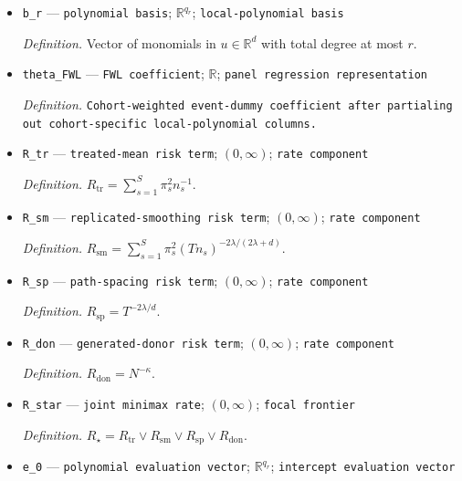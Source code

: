 \documentclass{article}
\begin{document}
\begin{itemize}
  \par\smallskip\noindent\emph{Definition.} A fixed nonnegative bounded compactly supported product weighting kernel that is bounded away from zero on a neighborhood of the origin and is used with the degree-\(r\) local-polynomial basis.
  \item \texttt{b\_\allowbreak{}r} --- \texttt{polynomial basis}; \(\mathbb R^{q_r}\); \texttt{local-\allowbreak{}polynomial basis}
  \par\smallskip\noindent\emph{Definition.} Vector of monomials in \(u\in\mathbb R^d\) with total degree at most \(r\).
  \item \texttt{theta\_\allowbreak{}FWL} --- \texttt{FWL coefficient}; \(\mathbb R\); \texttt{panel regression representation}
  \par\smallskip\noindent\emph{Definition.} \texttt{Cohort-\allowbreak{}weighted event-\allowbreak{}dummy coefficient after partialing out cohort-\allowbreak{}specific local-\allowbreak{}polynomial columns.}
  \item \texttt{R\_\allowbreak{}tr} --- \texttt{treated-\allowbreak{}mean risk term}; \((0,\infty)\); \texttt{rate component}
  \par\smallskip\noindent\emph{Definition.} \(R_{\mathrm{tr}}=\sum_{s=1}^{S}\pi_s^2n_s^{-1}\).
  \item \texttt{R\_\allowbreak{}sm} --- \texttt{replicated-\allowbreak{}smoothing risk term}; \((0,\infty)\); \texttt{rate component}
  \par\smallskip\noindent\emph{Definition.} \(R_{\mathrm{sm}}=\sum_{s=1}^{S}\pi_s^2(Tn_s)^{-2\lambda/(2\lambda+d)}\).
  \item \texttt{R\_\allowbreak{}sp} --- \texttt{path-\allowbreak{}spacing risk term}; \((0,\infty)\); \texttt{rate component}
  \par\smallskip\noindent\emph{Definition.} \(R_{\mathrm{sp}}=T^{-2\lambda/d}\).
  \item \texttt{R\_\allowbreak{}don} --- \texttt{generated-\allowbreak{}donor risk term}; \((0,\infty)\); \texttt{rate component}
  \par\smallskip\noindent\emph{Definition.} \(R_{\mathrm{don}}=N^{-\kappa}\).
  \item \texttt{R\_\allowbreak{}star} --- \texttt{joint minimax rate}; \((0,\infty)\); \texttt{focal frontier}
  \par\smallskip\noindent\emph{Definition.} \(R_\star=R_{\mathrm{tr}}\vee R_{\mathrm{sm}}\vee R_{\mathrm{sp}}\vee R_{\mathrm{don}}\).
  \item \texttt{e\_\allowbreak{}0} --- \texttt{polynomial evaluation vector}; \(\mathbb R^{q_r}\); \texttt{intercept evaluation vector}

\end{itemize}
\end{document}
